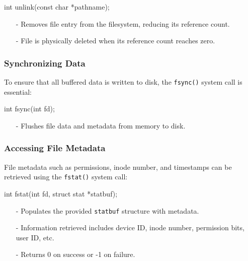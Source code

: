 \begin{cc}
int unlink(const char *pathname);
\end{cc}
\begin{itemize}[itemsep=2pt, topsep=1pt]
  \item[-] Removes file entry from the filesystem, reducing its reference count.
  \item[-] File is physically deleted when its reference count reaches zero.
\end{itemize}

\subsubsection{Synchronizing Data}

To ensure that all buffered data is written to disk, the \texttt{fsync()} system call is essential:

\begin{cc}
int fsync(int fd);
\end{cc}
\begin{itemize}[itemsep=2pt, topsep=1pt]
  \item[-] Flushes file data and metadata from memory to disk.
\end{itemize}

\subsubsection{Accessing File Metadata}
File metadata such as permissions, inode number, and timestamps can be retrieved using the \texttt{fstat()} system call:

\begin{cc}
int fstat(int fd, struct stat *statbuf);
\end{cc}
\begin{itemize}[itemsep=2pt, topsep=1pt]
  \item[-] Populates the provided \texttt{statbuf} structure with metadata.
  \item[-] Information retrieved includes device ID, inode number, permission bits, user ID, etc.
  \item[-] Returns 0 on success or -1 on failure.
\end{itemize}

